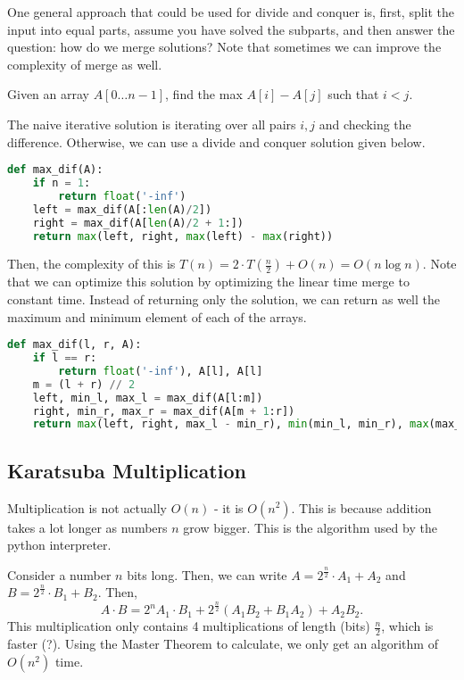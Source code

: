 
One general approach that could be used for divide and conquer is, first, split the input into equal parts, assume you have solved the subparts, and then answer the question: how do we merge solutions? Note that sometimes we can improve the complexity of merge as well.

\begin{eg}
	Given an array \( A[0\ldots n-1] \), find the max \( A[i] - A[j] \) such that \( i<j \).
\end{eg}
\begin{explanation}
	The naive iterative solution is iterating over all pairs \( i,j \) and checking the difference. Otherwise, we can use a divide and conquer solution given below.
\end{explanation}

\begin{lstlisting}[language=Python]
def max_dif(A):
	if n = 1:
		return float('-inf')
	left = max_dif(A[:len(A)/2])
	right = max_dif(A[len(A)/2 + 1:])
	return max(left, right, max(left) - max(right))
\end{lstlisting}

Then, the complexity of this is \( T(n) = 2\cdot T(\frac{n}{2}) + O(n) = O(n\log n)\). Note that we can optimize this solution by optimizing the linear time merge to constant time. Instead of returning only the solution, we can return as well the maximum and minimum element of each of the arrays.

\begin{lstlisting}[language=Python]
def max_dif(l, r, A):
	if l == r:
		return float('-inf'), A[l], A[l]
	m = (l + r) // 2
	left, min_l, max_l = max_dif(A[l:m])
	right, min_r, max_r = max_dif(A[m + 1:r])
	return max(left, right, max_l - min_r), min(min_l, min_r), max(max_l, max_r)
\end{lstlisting}

\subsection{Karatsuba Multiplication}

Multiplication is not actually \( O(n) \) - it is \( O(n^{2} ) \). This is because addition takes a lot longer as numbers \( n \) grow bigger. This is the algorithm used by the python interpreter.

Consider a number \( n \) bits long. Then, we can write \( A = 2^{\frac{n}{2}} \cdot A_{1} + A_{2} \) and \( B = 2^{\frac{n}{2}} \cdot B_{1} + B_{2}  \). Then, \[
	A \cdot B = 2^{n} A_{1}\cdot B_{1} + 2^{\frac{n}{2}} (A_{1}B_{2} + B_{1}A_{2}) + A_{2}B_{2} 
.\] This multiplication only contains 4 multiplications of length (bits) \( \frac{n}{2} \), which is faster (?). Using the Master Theorem to calculate, we only get an algorithm of \( O(n^{2} ) \) time.
